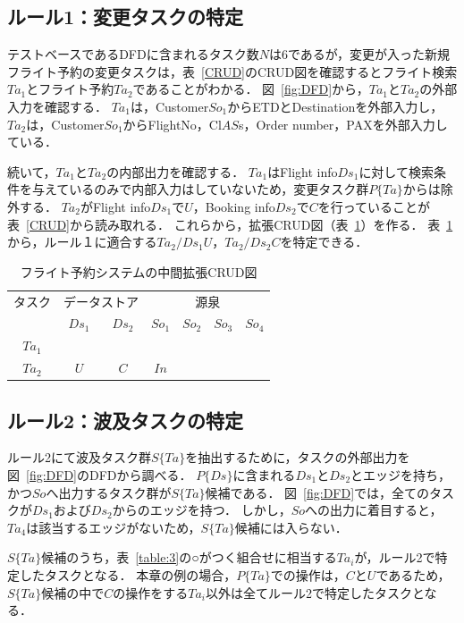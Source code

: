 
\subsection{ルール1：変更タスクの特定}
テストベースであるDFDに含まれるタスク数$N$は6であるが，変更が入った新規フライト予約の変更タスクは，表~\ref{CRUD}のCRUD図を確認するとフライト検索$Ta_1$とフライト予約$Ta_2$であることがわかる．
図~\ref{fig:DFD}から，$Ta_1$と$Ta_2$の外部入力を確認する．
$Ta_1$は，Customer$So_1$からETDとDestinationを外部入力し，$Ta_2$は，Customer$So_1$からFlightNo，Cl$AS$s，Order number，PAXを外部入力している．

続いて，$Ta_1$と$Ta_2$の内部出力を確認する．
$Ta_1$はFlight info$Ds_1$に対して検索条件を与えているのみで内部入力はしていないため，変更タスク群$P\{Ta\}$からは除外する．
$Ta_2$がFlight info$Ds_1$で$U$，Booking info$Ds_2$で$C$を行っていることが表~\ref{CRUD}から読み取れる．
これらから，拡張CRUD図（表~\ref{ECRUD1}）を作る．
表~\ref{ECRUD1}から，ルール１に適合する$Ta_2/Ds_1U$，$Ta_2/Ds_2C$を特定できる．

\begin{table}[t]
\caption{フライト予約システムの中間拡張CRUD図}
\label{ECRUD1}
\begin{center}
\begin{tabular}{c||c|c||c|c|c|c}
\hline
タスク&\multicolumn{2}{c||}{データストア}&\multicolumn{4}{c}{源泉}\\
&$Ds_1$&$Ds_2$&$So_1$&$So_2$&$So_3$&$So_4$\\
\hline\hline
$Ta_1$&&&&&&\\
\hline
$Ta_2$&$U$&$C$&$In$&&&\\
\hline
\end{tabular}
\end{center}
\end{table}%

\subsection{ルール2：波及タスクの特定}
ルール2にて波及タスク群$S\{Ta\}$を抽出するために，タスクの外部出力を図~\ref{fig:DFD}のDFDから調べる．
$P\{Ds\}$に含まれる$Ds_1$と$Ds_2$とエッジを持ち，かつ$So$へ出力するタスク群が$S\{Ta\}$候補である．
図~\ref{fig:DFD}では，全てのタスクが$Ds_1$および$Ds_2$からのエッジを持つ．
しかし，$So$への出力に着目すると，$Ta_4$は該当するエッジがないため，$S\{Ta\}$候補には入らない．

$S\{Ta\}$候補のうち，表~\ref{table:3}の○がつく組合せに相当する$Ta_i$が，ルール2で特定したタスクとなる．
本章の例の場合，$P\{Ta\}$での操作は，$C$と$U$であるため，$S\{Ta\}$候補の中で$C$の操作をする$Ta_i$以外は全てルール2で特定したタスクとなる．

